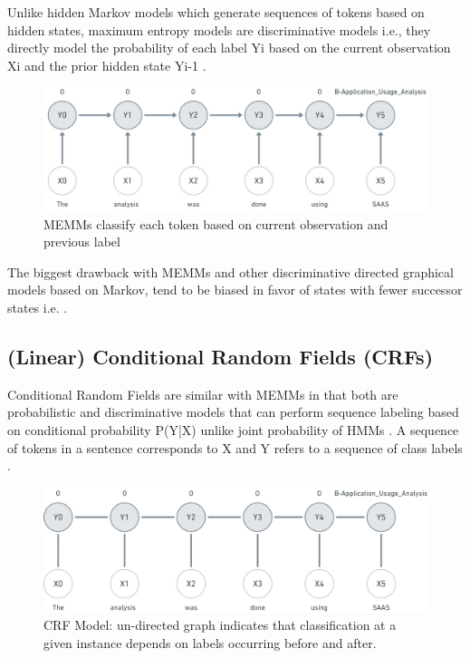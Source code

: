 Unlike hidden Markov models which generate sequences of tokens based on hidden states, maximum entropy models are discriminative models i.e., they directly model the probability of each label Yi based on the current observation Xi and the prior hidden state Yi-1 \citep{mccallum2000maximum}. 

\begin{figure}[htbp]
	\centering
	\includegraphics[width=1\textwidth]{4.graphics/figures/ch_5/MEMM}
	\caption{MEMMs classify each token based on current observation and previous label}
	\label{fig:chapter03:setup}
\end{figure}

The biggest drawback with MEMMs and other discriminative directed graphical models based on Markov, tend to be biased in favor of states with fewer successor states i.e. \citep{lafferty2001conditional}. 

\subsection{(Linear) Conditional Random Fields (\ac{CRF}s)}
\label{sec:chapter05:MLModels:CRFs}

Conditional Random Fields are similar with \ac{MEMM}s in that both are probabilistic and discriminative models that can perform sequence labeling based on conditional probability P(Y|X) unlike joint probability of \ac{HMM}s \citep{wallach2004conditional}. A sequence of tokens in a sentence corresponds to X and Y refers to a sequence of class labels \citep{lafferty2001conditional}. 

\begin{figure}[htbp]
	\centering
	\includegraphics[width=1\textwidth]{4.graphics/figures/ch_5/CRF}
	\caption{\ac{CRF} Model: un-directed graph indicates that classification at a given instance depends on labels occurring before and after.}
	\label{fig:chapter03:setup}
\end{figure}

